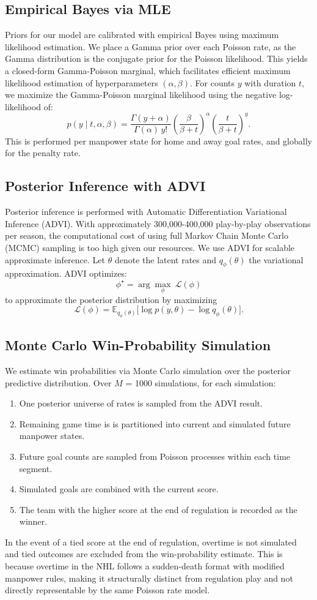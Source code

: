 \documentclass{article}
\begin{document}
\subsection{Empirical Bayes via MLE}
Priors for our model are calibrated with empirical Bayes using maximum likelihood estimation. We place a Gamma prior over each Poisson rate, as the Gamma distribution is the conjugate prior for the Poisson likelihood. This yields a closed-form Gamma-Poisson marginal, which facilitates efficient maximum likelihood estimation of hyperparameters $(\alpha, \beta)$. For counts $y$ with duration $t$, we maximize the Gamma-Poisson marginal likelihood using the negative log-likelihood of: 
\[
p(y \mid t,\alpha,\beta)
=
\frac{\Gamma(y+\alpha)}{\Gamma(\alpha)\,y!}
\left(\frac{\beta}{\beta+t}\right)^{\alpha}
\left(\frac{t}{\beta+t}\right)^{y}.
\]
This is performed per manpower state for home and away goal rates, and globally for the penalty rate.

\subsection{Posterior Inference with ADVI}
Posterior inference is performed with Automatic Differentiation Variational Inference (ADVI).
With approximately 300,000-400,000 play-by-play observations per season, the computational cost of using full Markov Chain Monte Carlo (MCMC) sampling is too high given our resources. We use ADVI for scalable approximate inference. Let $\theta$ denote the latent rates and $q_\phi(\theta)$ the variational approximation. ADVI optimizes:
\[
\phi^\star = \arg\max_\phi\ \mathcal{L}(\phi)
\]
to approximate the posterior distribution by maximizing
\[
\mathcal{L}(\phi)=\mathbb{E}_{q_\phi(\theta)}\big[\log p(y,\theta)-\log q_\phi(\theta)\big].
\]

\subsection{Monte Carlo Win-Probability Simulation}
We estimate win probabilities via Monte Carlo simulation over the posterior predictive distribution. Over $M$ = 1000 simulations, for each simulation:
\begin{enumerate}
\item One posterior universe of rates is sampled from the ADVI result.
\item Remaining game time is is partitioned into current and simulated future manpower states.
\item Future goal counts are sampled from Poisson processes within each time segment.
\item Simulated goals are combined with the current score.
\item The team with the higher score at the end of regulation is recorded as the winner.
\end{enumerate}
In the event of a tied score at the end of regulation, overtime is not simulated and tied outcomes are excluded from the win-probability estimate. This is because overtime in the NHL follows a sudden-death format with modified manpower rules, making it structurally distinct from regulation play and not directly representable by the same Poisson rate model.
\end{document}
